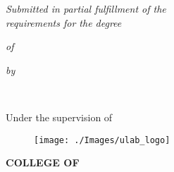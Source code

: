 \thispagestyle{empty}
\begin{center}
    { \Large {\bfseries {\ReportTitle}} \par}
\vspace{3\baselineskip}
    {\textit{\RoportType Submitted in partial fulfillment of the}\\
    \textit{requirements for the degree}}\par
\vspace{\baselineskip}
    {\textit{of} \par}
\vspace{\baselineskip}
    {\large \bf \Degree \par} 
\vspace{\baselineskip}
    {\textit{by} \par}
\vspace{\baselineskip}
    {{\large {\bf \firstAuthor \\ \firstAuthorID}} \par}
\vspace{1.5\baselineskip}
    {Under the supervision of \par}
\vspace{\baselineskip}
    {{\large \bf \Supervisor} \par}
\vspace{1.5\baselineskip}
    {\begin{figure}[!h] 
	\centering
	\texttt{[image: ./Images/ulab\_logo]} 
     \end{figure}
    }
\vspace{1.5\baselineskip}
    {\bf \MakeUppercase{College  of \College } \par}
\vspace*{1ex}
    {\bf \MakeUppercase{\University} \par}
\vspace*{5ex}
    {\bf \MakeUppercase{\reportSubmissionTerm} \par}    
    
 \end{center}